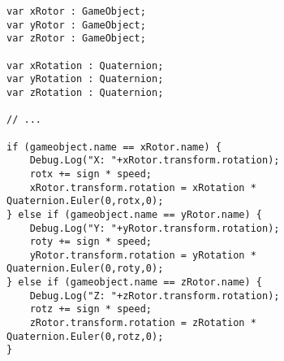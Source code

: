 \begin{verbatim}
var xRotor : GameObject;
var yRotor : GameObject;
var zRotor : GameObject;

var xRotation : Quaternion;
var yRotation : Quaternion;
var zRotation : Quaternion;

// ...

if (gameobject.name == xRotor.name) {
    Debug.Log("X: "+xRotor.transform.rotation);
    rotx += sign * speed;
    xRotor.transform.rotation = xRotation * Quaternion.Euler(0,rotx,0);
} else if (gameobject.name == yRotor.name) {
    Debug.Log("Y: "+yRotor.transform.rotation);
    roty += sign * speed;
    yRotor.transform.rotation = yRotation * Quaternion.Euler(0,roty,0);
} else if (gameobject.name == zRotor.name) {
    Debug.Log("Z: "+zRotor.transform.rotation);
    rotz += sign * speed;
    zRotor.transform.rotation = zRotation * Quaternion.Euler(0,rotz,0);
}
\end{verbatim}